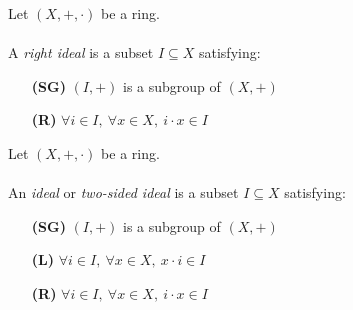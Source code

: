 \begin{definition-pre}
    \label{def:right_ideal}
    Let $(X, +, \cdot)$ be a ring. \\\\
    A \textit{right ideal} is a subset $I \subseteq X$ satisfying:
    \begin{enumerate}
        \item [\textbf{(SG)}] $(I, +)$ is a subgroup of $(X, +)$
        \item [\textbf{(R)}] $\forall i\in I,\ \forall x\in X,\ i\cdot x\in I$
    \end{enumerate}
\end{definition-pre}

\begin{definition-pre}[Ideal]
    \label{def:ideal}
    Let $(X, +, \cdot)$ be a ring. \\\\
    An \textit{ideal} or \textit{two-sided ideal} is a subset $I \subseteq X$ satisfying:
    \begin{enumerate}
        \item [\textbf{(SG)}] $(I, +)$ is a subgroup of $(X, +)$
        \item [\textbf{(L)}] $\forall i\in I,\ \forall x\in X,\ x\cdot i\in I$
        \item [\textbf{(R)}] $\forall i\in I,\ \forall x\in X,\ i\cdot x\in I$
    \end{enumerate}
\end{definition-pre}

